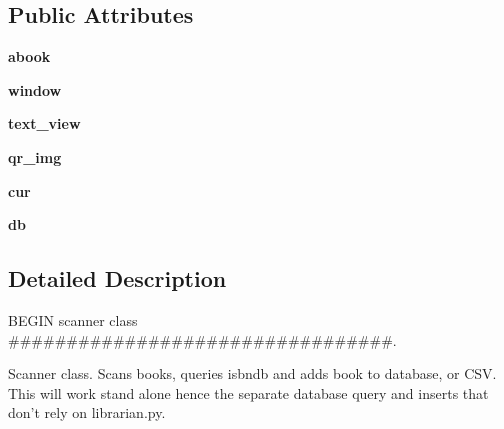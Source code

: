 \subsection*{Public Attributes}
\begin{DoxyCompactItemize}
\item 
\hypertarget{classguiscan_1_1scanner_a3134a254c5a937cdaf7c255dc731be68}{
{\bfseries abook}}
\label{classguiscan_1_1scanner_a3134a254c5a937cdaf7c255dc731be68}

\item 
\hypertarget{classguiscan_1_1scanner_a98cb3e16ca1e49cbc69b05acd7a688d4}{
{\bfseries window}}
\label{classguiscan_1_1scanner_a98cb3e16ca1e49cbc69b05acd7a688d4}

\item 
\hypertarget{classguiscan_1_1scanner_a8ab3328bd34b5be1a953e38cff2f2c36}{
{\bfseries text\_\-view}}
\label{classguiscan_1_1scanner_a8ab3328bd34b5be1a953e38cff2f2c36}

\item 
\hypertarget{classguiscan_1_1scanner_aaf4d4ec0eca657a409d5bfc30c2740aa}{
{\bfseries qr\_\-img}}
\label{classguiscan_1_1scanner_aaf4d4ec0eca657a409d5bfc30c2740aa}

\item 
\hypertarget{classguiscan_1_1scanner_a0c6e5cdc00e82cc84381f4957cfd4026}{
{\bfseries cur}}
\label{classguiscan_1_1scanner_a0c6e5cdc00e82cc84381f4957cfd4026}

\item 
\hypertarget{classguiscan_1_1scanner_a9c21bae12617cad3ca1fde0f3c75fad0}{
{\bfseries db}}
\label{classguiscan_1_1scanner_a9c21bae12617cad3ca1fde0f3c75fad0}

\end{DoxyCompactItemize}


\subsection{Detailed Description}
BEGIN scanner class \#\#\#\#\#\#\#\#\#\#\#\#\#\#\#\#\#\#\#\#\#\#\#\#\#\#\#\#\#\#\#\#\#. 

\begin{DoxyVerb}Scanner class. Scans books, queries isbndb and adds book to database,
or CSV.  This will work stand alone hence the separate database query
and inserts that don't rely on librarian.py.

\end{DoxyVerb}
 

